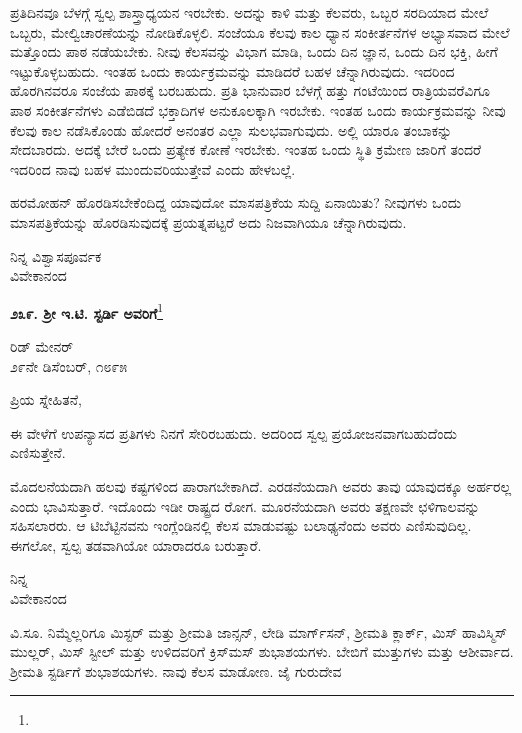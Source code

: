 ಪ್ರತಿದಿನವೂ ಬೆಳಗ್ಗೆ ಸ್ವಲ್ಪ ಶಾಸ್ತ್ರಾಧ್ಯಯನ ಇರಬೇಕು. ಅದನ್ನು ಕಾಳಿ ಮತ್ತು ಕೆಲವರು, ಒಬ್ಬರ ಸರದಿಯಾದ ಮೇಲೆ ಒಬ್ಬರು, ಮೇಲ್ವಿಚಾರಣೆಯನ್ನು ನೋಡಿಕೊಳ್ಳಲಿ. ಸಂಜೆಯೂ ಕೆಲವು ಕಾಲ ಧ್ಯಾನ ಸಂಕೀರ್ತನೆಗಳ ಅಭ್ಯಾಸವಾದ ಮೇಲೆ ಮತ್ತೊಂದು ಪಾಠ ನಡೆಯಬೇಕು. ನೀವು ಕೆಲಸವನ್ನು ವಿಭಾಗ ಮಾಡಿ, ಒಂದು ದಿನ ಜ್ಞಾನ, ಒಂದು ದಿನ ಭಕ್ತಿ, ಹೀಗೆ ಇಟ್ಟುಕೊಳ್ಳಬಹುದು. ಇಂತಹ ಒಂದು ಕಾರ್ಯಕ್ರಮವನ್ನು ಮಾಡಿದರೆ ಬಹಳ ಚೆನ್ನಾಗಿರುವುದು. ಇದರಿಂದ ಹೊರಗಿನವರೂ ಸಂಜೆಯ ಪಾಠಕ್ಕೆ ಬರಬಹುದು. ಪ್ರತಿ ಭಾನುವಾರ ಬೆಳಗ್ಗೆ ಹತ್ತು ಗಂಟೆಯಿಂದ ರಾತ್ರಿಯವರೆವಿಗೂ ಪಾಠ ಸಂಕೀರ್ತನೆಗಳು ಎಡೆಬಿಡದೆ ಭಕ್ತಾದಿಗಳ ಅನುಕೂಲಕ್ಕಾಗಿ ಇರಬೇಕು. ಇಂತಹ ಒಂದು ಕಾರ್ಯಕ್ರಮವನ್ನು ನೀವು ಕೆಲವು ಕಾಲ ನಡೆಸಿಕೊಂಡು ಹೋದರೆ ಅನಂತರ ಎಲ್ಲಾ ಸುಲಭವಾಗುವುದು. ಅಲ್ಲಿ ಯಾರೂ ತಂಬಾಕನ್ನು ಸೇದಬಾರದು. ಅದಕ್ಕೆ ಬೇರೆ ಒಂದು ಪ್ರತ್ಯೇಕ ಕೋಣೆ ಇರಬೇಕು. ಇಂತಹ ಒಂದು ಸ್ಥಿತಿ ಕ್ರಮೇಣ ಜಾರಿಗೆ ತಂದರೆ ಇದರಿಂದ ನಾವು ಬಹಳ ಮುಂದುವರಿಯುತ್ತೇವೆ ಎಂದು ಹೇಳಬಲ್ಲೆ.

ಹರಮೋಹನ್ ಹೊರಡಿಸಬೇಕೆಂದಿದ್ದ ಯಾವುದೋ ಮಾಸಪತ್ರಿಕೆಯ ಸುದ್ದಿ ಏನಾಯಿತು? ನೀವುಗಳು ಒಂದು ಮಾಸಪತ್ರಿಕೆಯನ್ನು ಹೊರಡಿಸುವುದಕ್ಕೆ ಪ್ರಯತ್ನಪಟ್ಟರೆ ಅದು ನಿಜವಾಗಿಯೂ ಚೆನ್ನಾಗಿರುವುದು.

{\flushright
ನಿನ್ನ ವಿಶ್ವಾಸಪೂರ್ವಕ\\ವಿವೇಕಾನಂದ\par}

\begin{center}
\textbf{೨೩೯. ಶ‍್ರೀ ಇ.ಟಿ. ಸ್ಟರ್ಡಿ ಅವರಿಗೆ}\footnote{}
\end{center}

\begin{flushright}
ರಿಡ್ ಮೇನರ್\\೨೯ನೇ ಡಿಸೆಂಬರ್, ೧೮೯೫
\end{flushright}

\noindent
ಪ್ರಿಯ ಸ್ನೇಹಿತನೆ,

ಈ ವೇಳೆಗೆ ಉಪನ್ಯಾಸದ ಪ್ರತಿಗಳು ನಿನಗೆ ಸೇರಿರಬಹುದು. ಅದರಿಂದ ಸ್ವಲ್ಪ ಪ್ರಯೋಜನವಾಗಬಹುದೆಂದು ಎಣಿಸುತ್ತೇನೆ.

ಮೊದಲನೆಯದಾಗಿ ಹಲವು ಕಷ್ಟಗಳಿಂದ ಪಾರಾಗಬೇಕಾಗಿದೆ. ಎರಡನೆಯದಾಗಿ ಅವರು ತಾವು ಯಾವುದಕ್ಕೂ ಅರ್ಹರಲ್ಲ ಎಂದು ಭಾವಿಸುತ್ತಾರೆ. ಇದೊಂದು ಇಡೀ ರಾಷ್ಟ್ರದ ರೋಗ. ಮೂರನೆಯದಾಗಿ ಅವರು ತಕ್ಷಣವೇ ಛಳಿಗಾಲವನ್ನು ಸಹಿಸಲಾರರು. ಆ ಟಿಬೆಟ್ಟಿನವನು ಇಂಗ್ಲೆಂಡಿನಲ್ಲಿ ಕೆಲಸ ಮಾಡುವಷ್ಟು ಬಲಾಢ್ಯನೆಂದು ಅವರು ಎಣಿಸುವುದಿಲ್ಲ. ಈಗಲೋ, ಸ್ವಲ್ಪ ತಡವಾಗಿಯೋ ಯಾರಾದರೂ ಬರುತ್ತಾರೆ.

{\flushright
ನಿನ್ನ\\ವಿವೇಕಾನಂದ\par}

ವಿ.ಸೂ.\enginline{-} ನಿಮ್ಮೆಲ್ಲರಿಗೂ \enginline{-} ಮಿಸ್ಟರ್ ಮತ್ತು ಶ‍್ರೀಮತಿ ಜಾನ್ಸನ್, ಲೇಡಿ ಮಾರ್ಗ್‌ಸನ್, ಶ‍್ರೀಮತಿ ಕ್ಲಾರ್ಕ್, ಮಿಸ್ ಹಾವಿಸ್\enginline{-}ಮಿಸ್ ಮುಲ್ಲರ್, ಮಿಸ್ ಸ್ಟೀಲ್ ಮತ್ತು ಉಳಿದವರಿಗೆ ಕ್ರಿಸ್‌ಮಸ್ ಶುಭಾಶಯಗಳು. ಬೇಬಿಗೆ ಮುತ್ತುಗಳು ಮತ್ತು ಆಶೀರ್ವಾದ. ಶ‍್ರೀಮತಿ ಸ್ಟರ್ಡಿಗೆ ಶುಭಾಶಯಗಳು. ನಾವು ಕೆಲಸ ಮಾಡೋಣ. ಜೈ ಗುರುದೇವ

